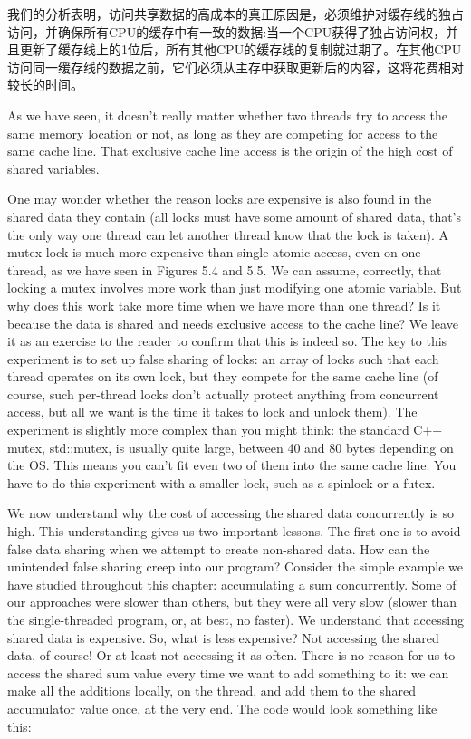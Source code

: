 我们的分析表明，访问共享数据的高成本的真正原因是，必须维护对缓存线的独占访问，并确保所有CPU的缓存中有一致的数据:当一个CPU获得了独占访问权，并且更新了缓存线上的1位后，所有其他CPU的缓存线的复制就过期了。在其他CPU访问同一缓存线的数据之前，它们必须从主存中获取更新后的内容，这将花费相对较长的时间。

As we have seen, it doesn't really matter whether two threads try to access the same memory location or not, as long as they are competing for access to the same cache line. That exclusive cache line access is the origin of the high cost of shared variables. 

One may wonder whether the reason locks are expensive is also found in the shared data they contain (all locks must have some amount of shared data, that's the only way one thread can let another thread know that the lock is taken). A mutex lock is much more expensive than single atomic access, even on one thread, as we have seen in Figures 5.4 and 5.5. We can assume, correctly, that locking a mutex involves more work than just modifying one atomic variable. But why does this work take more time when we have more than one thread? Is it because the data is shared and needs exclusive access to the cache line? We leave it as an exercise to the reader to confirm that this is indeed so. The key to this experiment is to set up false sharing of locks: an array of locks such that each thread operates on its own lock, but they compete for the same cache line (of course, such per-thread locks don't actually protect anything from concurrent access, but all we want is the time it takes to lock and unlock them). The experiment is slightly more complex than you might think: the standard C++ mutex, std::mutex, is usually quite large, between 40 and 80 bytes depending on the OS. This means you can't fit even two of them into the same cache line. You have to do this experiment with a smaller lock, such as a spinlock or a futex.

We now understand why the cost of accessing the shared data concurrently is so high. This understanding gives us two important lessons. The first one is to avoid false data sharing when we attempt to create non-shared data. How can the unintended false sharing creep into our program? Consider the simple example we have studied throughout this chapter: accumulating a sum concurrently. Some of our approaches were slower than others, but they were all very slow (slower than the single-threaded program, or, at best, no faster). We understand that accessing shared data is expensive. So, what is less expensive? Not accessing the shared data, of course! Or at least not accessing it as often. There is no reason for us to access the shared sum value every time we want to add something to it: we can make all the additions locally, on the thread, and add them to the shared accumulator value once, at the very end. The code would look something like this: 

